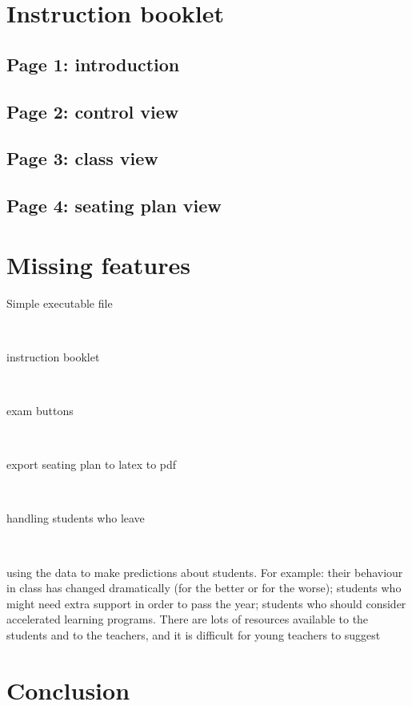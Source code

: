 \documentclass[10pt]{article}
\begin{document}
\section{Instruction booklet} \label{instructions}

\subsection{Page 1: introduction}

\subsection{Page 2: control view}

\subsection{Page 3: class view}

\subsection{Page 4: seating plan view}


\section{Missing features} \label{notdone}

Simple executable file

\

instruction booklet

\

exam buttons

\

export seating plan to latex to pdf

\

handling students who leave

\

using the data to make predictions about students. For example: their behaviour in class has changed dramatically (for the better or for the worse); students who might need extra support in order to pass the year; students who should consider accelerated learning programs. There are lots of resources available to the students and to the teachers, and it is difficult for young teachers to suggest



\section{Conclusion}
\end{document}
